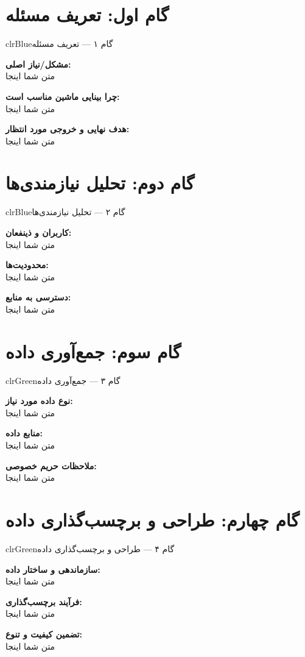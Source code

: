 \documentclass[12pt, a4paper]{article}
\begin{document}
\newpage
\tableofcontents
\newpage

\newcommand{\field}[2]{\textbf{#1:}\\ #2 \medskip}

\section{گام اول: تعریف مسئله}
\begin{stepbox}{clrBlue}{گام ۱ — تعریف مسئله}

\field{مشکل/نیاز اصلی}{متن شما اینجا}

\field{چرا بینایی ماشین مناسب است}{متن شما اینجا}

\field{هدف نهایی و خروجی مورد انتظار}{متن شما اینجا}

\end{stepbox}

\newpage
\section{گام دوم: تحلیل نیازمندی‌ها}
\begin{stepbox}{clrBlue}{گام ۲ — تحلیل نیازمندی‌ها}

\field{کاربران و ذینفعان}{متن شما اینجا}

\field{محدودیت‌ها}{متن شما اینجا}

\field{دسترسی به منابع}{متن شما اینجا}

\end{stepbox}

\newpage
\section{گام سوم: جمع‌آوری داده}
\begin{stepbox}{clrGreen}{گام ۳ — جمع‌آوری داده}

\field{نوع داده مورد نیاز}{متن شما اینجا}

\field{منابع داده}{متن شما اینجا}

\field{ملاحظات حریم خصوصی}{متن شما اینجا}

\end{stepbox}

\newpage
\section{گام چهارم: طراحی و برچسب‌گذاری داده}
\begin{stepbox}{clrGreen}{گام ۴ — طراحی و برچسب‌گذاری داده}

\field{سازماندهی و ساختار داده}{متن شما اینجا}

\field{فرآیند برچسب‌گذاری}{متن شما اینجا}

\field{تضمین کیفیت و تنوع}{متن شما اینجا}

\end{stepbox}
\end{document}
